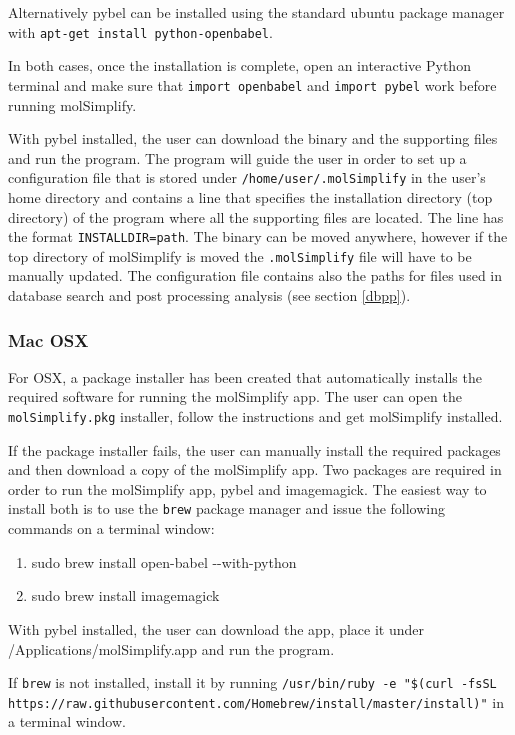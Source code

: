 Alternatively pybel can be installed using the standard ubuntu package manager with \texttt{apt-get install python-openbabel}.

In both cases, once the installation is complete, open an interactive Python terminal and make sure that \texttt{import openbabel} and \texttt{import pybel} work before running molSimplify. 

With pybel installed, the user can download the binary and the supporting files and run the program. The program will guide the user in order to set up a configuration file that is stored under \texttt{/home/user/.molSimplify} in the user's home directory and contains a line that specifies the installation directory (top directory) of the program where all the supporting files are located. The line has the format \texttt{INSTALLDIR=path}. The binary can be moved anywhere, however if the top directory of molSimplify is moved the \texttt{.molSimplify} file will have to be manually updated. The configuration file contains also the paths for files used in database search and post processing analysis (see section \ref{dbpp}).

\subsubsection{Mac OSX}\label{osxbin}

For OSX, a package installer has been created that automatically installs the required software for running the molSimplify app. The user can open the \texttt{molSimplify.pkg} installer, follow the instructions and get molSimplify installed.

If the package installer fails, the user can manually install the required packages and then download a copy of the molSimplify app. Two packages are required in order to run the molSimplify app, pybel and imagemagick. The easiest way to install both is to use the \texttt{brew} package manager and issue the following commands on a terminal window:
\begin{enumerate}
\item sudo brew install open-babel -\hspace{0.02cm}-with-python
\item sudo brew install imagemagick
\end{enumerate}

With pybel installed, the user can download the app, place it under /Applications/molSimplify.app and run the program.

If \texttt{brew} is not installed, install it by running \texttt{/usr/bin/ruby -e "\$(curl -fsSL https://raw.githubusercontent.com/Homebrew/install/master/install)"} in a terminal window.



